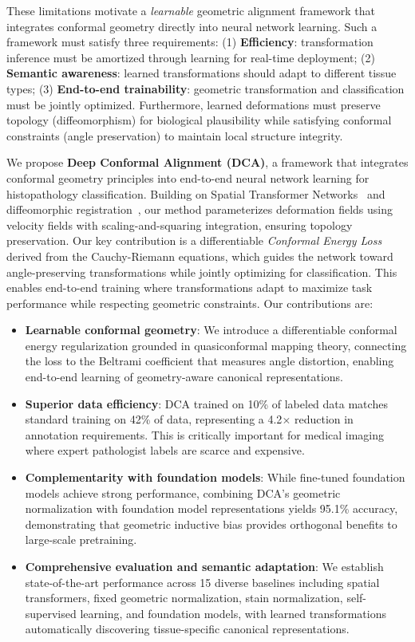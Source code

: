 \documentclass[final,3p,times,review,sort&compress]{elsarticle}
\begin{document}
These limitations motivate a \textit{learnable} geometric alignment framework that integrates conformal geometry directly into neural network learning. Such a framework must satisfy three requirements: (1) \textbf{Efficiency}: transformation inference must be amortized through learning for real-time deployment; (2) \textbf{Semantic awareness}: learned transformations should adapt to different tissue types; (3) \textbf{End-to-end trainability}: geometric transformation and classification must be jointly optimized. Furthermore, learned deformations must preserve topology (diffeomorphism) for biological plausibility while satisfying conformal constraints (angle preservation) to maintain local structure integrity.

We propose \textbf{Deep Conformal Alignment (DCA)}, a framework that integrates conformal geometry principles into end-to-end neural network learning for histopathology classification. Building on Spatial Transformer Networks~\cite{jaderberg2015spatial} and diffeomorphic registration~\cite{balakrishnan2019voxelmorph}, our method parameterizes deformation fields using velocity fields with scaling-and-squaring integration, ensuring topology preservation. Our key contribution is a differentiable \textit{Conformal Energy Loss} derived from the Cauchy-Riemann equations, which guides the network toward angle-preserving transformations while jointly optimizing for classification. This enables end-to-end training where transformations adapt to maximize task performance while respecting geometric constraints. Our contributions are:
\begin{itemize}
    \item \textbf{Learnable conformal geometry}: We introduce a differentiable conformal energy regularization grounded in quasiconformal mapping theory, connecting the loss to the Beltrami coefficient that measures angle distortion, enabling end-to-end learning of geometry-aware canonical representations.
    \item \textbf{Superior data efficiency}: DCA trained on 10\% of labeled data matches standard training on 42\% of data, representing a 4.2$\times$ reduction in annotation requirements. This is critically important for medical imaging where expert pathologist labels are scarce and expensive.
    \item \textbf{Complementarity with foundation models}: While fine-tuned foundation models achieve strong performance, combining DCA's geometric normalization with foundation model representations yields 95.1\% accuracy, demonstrating that geometric inductive bias provides orthogonal benefits to large-scale pretraining.
    \item \textbf{Comprehensive evaluation and semantic adaptation}: We establish state-of-the-art performance across 15 diverse baselines including spatial transformers, fixed geometric normalization, stain normalization, self-supervised learning, and foundation models, with learned transformations automatically discovering tissue-specific canonical representations.
\end{itemize}
\end{document}
